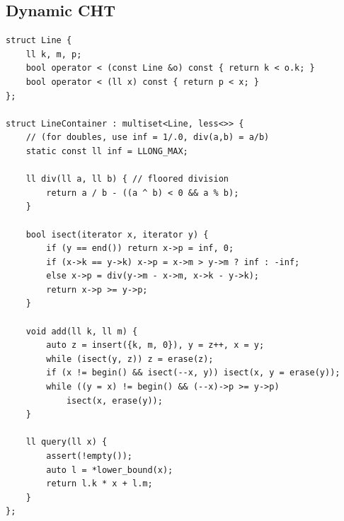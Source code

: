 \documentclass[10pt, portrait,letterpaper]{article}
\begin{document}
\subsection{Dynamic CHT}
\begin{verbatim}
struct Line {
    ll k, m, p;
    bool operator < (const Line &o) const { return k < o.k; }
    bool operator < (ll x) const { return p < x; }
};

struct LineContainer : multiset<Line, less<>> {
    // (for doubles, use inf = 1/.0, div(a,b) = a/b)
    static const ll inf = LLONG_MAX;
    
    ll div(ll a, ll b) { // floored division
        return a / b - ((a ^ b) < 0 && a % b);
    }
    
    bool isect(iterator x, iterator y) {
        if (y == end()) return x->p = inf, 0;
        if (x->k == y->k) x->p = x->m > y->m ? inf : -inf;
        else x->p = div(y->m - x->m, x->k - y->k);
        return x->p >= y->p;
    }

    void add(ll k, ll m) {
        auto z = insert({k, m, 0}), y = z++, x = y;
        while (isect(y, z)) z = erase(z);
        if (x != begin() && isect(--x, y)) isect(x, y = erase(y));
        while ((y = x) != begin() && (--x)->p >= y->p)
            isect(x, erase(y));
    }

    ll query(ll x) {
        assert(!empty());
        auto l = *lower_bound(x);
        return l.k * x + l.m;
    }
};
\end{verbatim}
\end{document}
